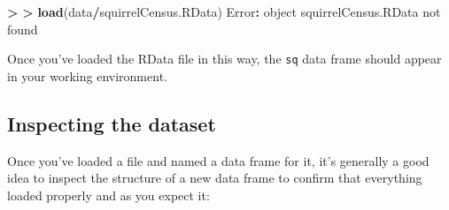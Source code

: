 \documentclass[
]{book}
\newenvironment{Shaded}{\begin{snugshade}}{\end{snugshade}}
\newcommand{\ErrorTok}[1]{\textcolor[rgb]{0.64,0.00,0.00}{\textbf{#1}}}
\newcommand{\FunctionTok}[1]{\textcolor[rgb]{0.13,0.29,0.53}{\textbf{#1}}}
\newcommand{\NormalTok}[1]{#1}
\newcommand{\SpecialCharTok}[1]{\textcolor[rgb]{0.81,0.36,0.00}{\textbf{#1}}}
\newcommand{\StringTok}[1]{\textcolor[rgb]{0.31,0.60,0.02}{#1}}
\begin{document}
\begin{Shaded}
\begin{Highlighting}[]
\SpecialCharTok{\textgreater{}} 
\ErrorTok{\textgreater{}} \FunctionTok{load}\NormalTok{(data}\SpecialCharTok{/}\NormalTok{squirrelCensus.RData)}
\NormalTok{Error}\SpecialCharTok{:}\NormalTok{ object }\StringTok{\textquotesingle{}squirrelCensus.RData\textquotesingle{}}\NormalTok{ not found}
\end{Highlighting}
\end{Shaded}

Once you've loaded the RData file in this way, the \texttt{sq} data frame should appear in your working environment.

\subsection{Inspecting the dataset}\label{inspecting-the-dataset}

Once you've loaded a file and named a data frame for it, it's generally a good idea to inspect the structure of a new data frame to confirm that everything loaded properly and as you expect it:
\end{document}
